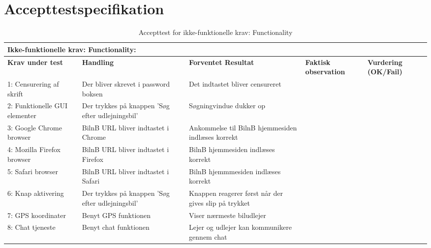 


\section{Accepttestspecifikation}

\begin{table}[H]
	\centering 
	\begin{tabular}{|p{3cm}|p{3cm}|p{3cm}|p{2cm}|p{2cm}|} %
		\toprule 	%
		\multicolumn{5}{|l|}{\textbf{Ikke-funktionelle krav: Functionality:}}\\\midrule
			\textbf{Krav under test} & \textbf{Handling} & \textbf{Forventet Resultat} & \textbf{Faktisk observation} & \textbf{Vurdering (OK/Fail)} \\ \midrule 	%
		1: Censurering af skrift  &Der bliver skrevet i password boksen & Det indtastet bliver censureret &  &   \\ \hline
		2: Funktionelle GUI elementer  & Der trykkes på knappen 'Søg efter udlejningsbil' & Søgningvindue dukker op  & &  \\ \hline
		3: Google Chrome browser  & BilnB URL bliver indtastet i Chrome & Ankommelse til BilnB hjemmesiden indlæses korrekt  & & \\ \hline
		4: Mozilla Firefox browser  &  BilnB URL bliver indtastet i Firefox & BilnB hjemmesiden indlæses korrekt  & &  \\ \hline
		5: Safari browser  & BilnB URL bliver indtastet i Safari & BilnB hjemmmesiden indlæses korrekt & &   \\ \hline
		6: Knap aktivering & Der trykkes på knappen 'Søg efter udlejningsbil' & Knappen reagerer først når der gives slip på trykket &  &   \\ \hline
		7: GPS koordinater & Benyt GPS funktionen & Viser nærmeste biludlejer & & \\ \hline
		8: Chat tjeneste & Benyt chat funktionen & Lejer og udlejer kan kommunikere gennem chat & & \\ \hline
\bottomrule
	\end{tabular} 
	\caption{Accepttest for ikke-funktionelle krav: Functionality } 
	\label{tab:Accept_Func} 
\end{table}


